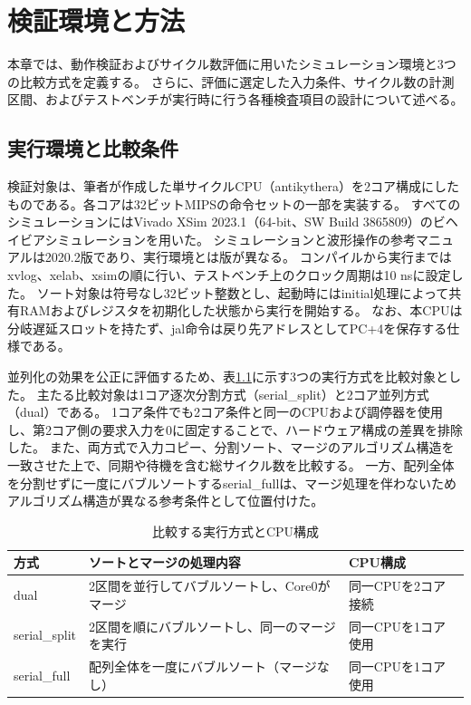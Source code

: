 \chapter{検証環境と方法}\label{chap:3}

本章では、動作検証およびサイクル数評価に用いたシミュレーション環境と3つの比較方式を定義する。
さらに、評価に選定した入力条件、サイクル数の計測区間、およびテストベンチが実行時に行う各種検査項目の設計について述べる。

\section{実行環境と比較条件}\label{sec:3-1}

検証対象は、筆者が作成した単サイクルCPU（antikythera\cite{antikythera}）を2コア構成にしたものである。各コアは32ビットMIPSの命令セットの一部を実装する。
すべてのシミュレーションにはVivado XSim 2023.1（64-bit、SW Build 3865809）のビヘイビアシミュレーションを用いた。
シミュレーションと波形操作の参考マニュアル\cite{ug900,ug835}は2020.2版であり、実行環境とは版が異なる。
コンパイルから実行まではxvlog、xelab、xsimの順に行い、テストベンチ上のクロック周期は10 nsに設定した。
ソート対象は符号なし32ビット整数とし、起動時にはinitial処理によって共有RAMおよびレジスタを初期化した状態から実行を開始する。
なお、本CPUは分岐遅延スロットを持たず、jal命令は戻り先アドレスとしてPC+4を保存する仕様である。

並列化の効果を公正に評価するため、表\ref{tab:3}に示す3つの実行方式を比較対象とした。
主たる比較対象は1コア逐次分割方式（serial\_split）と2コア並列方式（dual）である。
1コア条件でも2コア条件と同一のCPUおよび調停器を使用し、第2コア側の要求入力を0に固定することで、ハードウェア構成の差異を排除した。
また、両方式で入力コピー、分割ソート、マージのアルゴリズム構造を一致させた上で、同期や待機を含む総サイクル数を比較する。
一方、配列全体を分割せずに一度にバブルソートするserial\_fullは、マージ処理を伴わないためアルゴリズム構造が異なる参考条件として位置付けた。

\begin{table}[H]
\centering
\caption{比較する実行方式とCPU構成}
\label{tab:3}
\footnotesize
\setlength{\tabcolsep}{3pt}
\renewcommand{\arraystretch}{1.25}
\begin{tabular}{>{\raggedright\arraybackslash}p{}>{\raggedright\arraybackslash}p{}>{\raggedright\arraybackslash}p{}}\toprule
\textbf{方式} & \textbf{ソートとマージの処理内容} & \textbf{CPU構成}\\\midrule
dual & 2区間を並行してバブルソートし、Core0がマージ & 同一CPUを2コア接続\\
serial\_split & 2区間を順にバブルソートし、同一のマージを実行 & 同一CPUを1コア使用\\
serial\_full & 配列全体を一度にバブルソート（マージなし） & 同一CPUを1コア使用\\
\bottomrule\end{tabular}
\end{table}

